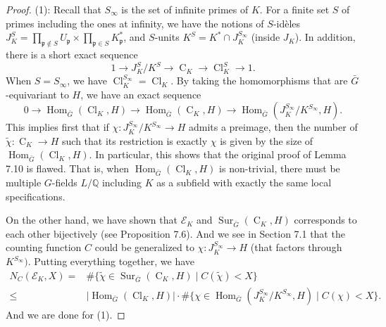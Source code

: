 \documentclass[10pt,a4paper]{amsart}
\begin{document}
\begin{proof}
	(1):
	Recall that $S_{\infty}$ is the set of infinite primes of $K$.
	For a finite set $S$ of primes including the ones at infinity, we have the notions of $S$-id{\`e}les $J_K^{S}=\prod_{\mathfrak{p}\notin S}U_{\mathfrak{p}}\times\prod_{\mathfrak{p}\in S}K_{\mathfrak{p}}^*$, and $S$-units $K^{S}=K^*\cap J_K^{S_\infty}$ (inside $J_K$).
	In addition, there is a short exact sequence
	\begin{equation*}
		1\to J_K^{S}/K^S\to\operatorname{C}_K\to\operatorname{Cl}_K^S\to1.
	\end{equation*}
	When $S=S_{\infty}$, we have $\operatorname{Cl}_K^{S_\infty}=\operatorname{Cl}_K$.
	By taking the homomorphisms that are $\bar{G}$-equivariant to $H$, we have an exact sequence
	\begin{equation*}
		0\to\operatorname{Hom}_{\bar{G}}(\operatorname{Cl}_K,H)\to\operatorname{Hom}_{\bar{G}}(\operatorname{C}_K,H)\to\operatorname{Hom}_{\bar{G}}(J_K^{S_{\infty}}/K^{S_{\infty}},H).
	\end{equation*}
	This implies first that if $\chi:J_K^{S_{\infty}}/K^{S_{\infty}}\to H$ admits a preimage, then the number of $\tilde{\chi}:\operatorname{C}_K\to H$ such that its restriction is exactly $\chi$ is given by the size of $\operatorname{Hom}_{\bar{G}}(\operatorname{Cl}_K,H)$.
	In particular, this shows that the original proof of Lemma 7.10 is flawed.
	That is, when $\operatorname{Hom}_{\bar{G}}(\operatorname{Cl}_K,H)$ is non-trivial, there must be multiple $G$-fields $L/\mathbb{Q}$ including $K$ as a subfield with exactly the same local specifications.
	
	On the other hand, we have shown that $\mathcal{E}_K$ and $\operatorname{Sur}_{\bar{G}}(\operatorname{C}_K,H)$ corresponds to each other bijectively (see Proposition 7.6).
	And we see in Section 7.1 that the counting function $C$ could be generalized to $\chi:J_K^{S_{\infty}}\to H$ (that factors through $K^{S_{\infty}})$.
	Putting everything together, we have
	\begin{equation*}
		\begin{aligned}
			N_C(\mathcal{E}_K,X)=&\#\{\tilde{\chi}\in\operatorname{Sur}_{\bar{G}}(\operatorname{C}_K,H)\mid C(\tilde{\chi})<X\}
			\\
			\leq&\lvert\operatorname{Hom}_{\bar{G}}(\operatorname{Cl}_K,H)\rvert\cdot\#\{\chi\in\operatorname{Hom}_{\bar{G}}(J_K^{S_{\infty}}/K^{S_{\infty}}, H)\mid C(\chi)<X\}.
		\end{aligned}
	\end{equation*}
	And we are done for (1).
	

\end{proof}
\end{document}
